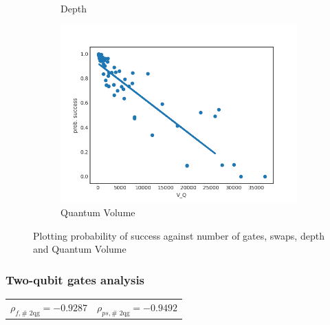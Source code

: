 \documentclass[11pt]{article}
\begin{document}
\begin{figure}[H]
\begin{subfigure}[b]{0.5\linewidth}
    \caption{Depth} 
    \label{fig:ps_d_3000_0} 
  \end{subfigure}%
  \begin{subfigure}[b]{0.5\linewidth}
    \centering
    \includegraphics[width=0.75\linewidth]{ps_q_3000_0} 
    \caption{Quantum Volume} 
    \label{fig:ps_q_3000_0} 
  \end{subfigure} 
  \caption{Plotting probability of success against number of gates, swaps, depth and Quantum Volume}
  \label{fig:ps_3000_0} 
\end{figure}

\subsubsection{Two-qubit gates analysis}
\label{sec:org5a99147}

\begin{center}
\begin{tabular}{ll}
\(\rho _{f,\text{# 2qg}} = -0.9287\) & \(\rho _{ps,\text{# 2qg}} = -0.9492\)\\
\end{tabular}
\end{center}
\end{document}
